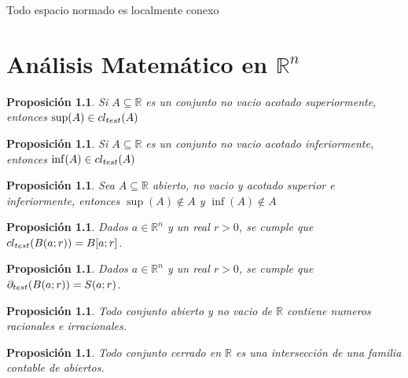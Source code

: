 \documentclass[oneside]{book} %
\theoremstyle{Teorema}
\newtheorem{Proposicion}[Definicion]{Proposición}
\theoremstyle{Ejemplos}
\theoremstyle{[Obs]}
\def \test {test}
\newcommand{\cerradura}[2][\test]{\ifx \test #1 {\overline{#2}} \else {cl_{#1}(#2)} \fi} %
\newcommand{\frontera}[2][\test]{\ifx \test #1 {\partial(#2)} \else {\partial_{#1}(#2)} \fi} %
\renewcommand{\{}{\left\lbrace} %
\renewcommand{\}}{\right\rbrace} %
\renewcommand{\sc}{\subseteq} %
\newcommand{\R}{\mathbb{R}} %
\newcommand{\Rn}{\mathbb{R}^n} %
\begin{document}
		Todo espacio normado es localmente conexo

	\chapter{Análisis Matemático en $\Rn$} 

		\begin{Proposicion}\setlength{\parindent}{0em}
		
			Si $A \sc \R$ es un conjunto no vacio acotado superiormente, entonces $\sup(A) \in \cerradura{A}$ 
		
		\end{Proposicion}

		\begin{Proposicion}\setlength{\parindent}{0em}
		
			Si $A \sc \R$ es un conjunto no vacio acotado inferiormente, entonces $\inf(A) \in \cerradura{A}$
		
		\end{Proposicion}

		\begin{Proposicion}\setlength{\parindent}{0em}
		
			Sea $A \sc \R$ abierto, no vacio y acotado superior e inferiormente, entonces $\sup(A) \notin A$ y $\inf(A) \notin A$
		
		\end{Proposicion}

		\begin{Proposicion}\setlength{\parindent}{0em}
					
			Dados $a \in \Rn$ y un real $r > 0$, se cumple que $\cerradura{B(a;r)} = B[a;r]$.

		\end{Proposicion}

		\begin{Proposicion}\setlength{\parindent}{0em}
			
			Dados $a \in \Rn$ y un real $r > 0$, se cumple que $\frontera{B(a;r)} = S(a;r)$. 

		\end{Proposicion}

		\begin{Proposicion}\setlength{\parindent}{0em}
		
			Todo conjunto abierto y no vacio de $\R$ contiene numeros racionales e irracionales.
		
		\end{Proposicion}

		\begin{Proposicion}\setlength{\parindent}{0em}
		
			Todo conjunto cerrado en $\R$ es una intersección de una familia contable de abiertos.
		
		\end{Proposicion}
\end{document}
